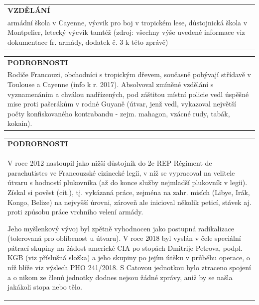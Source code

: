 \documentclass[a4paper, 11pt]{article}
\newlength{\fontheight}
\def\bottomrulewidth{0.3mm}		%
\def\tabtitleextraheight{5pt}	%
\def\tablestretch{1.4}			%
\newcommand{\blackcell}{\cellcolor{black} \color{white} \ttfamily \bfseries}
\newcommand{\tabtitle}[2]{\multicolumn{#1}{l}{\blackcell \MakeUppercase{#2}\rule{0pt}{\dimexpr \fontheight + 1pt + \tabtitleextraheight \relax} } \\ [\tabtitleextraheight]}
\newcommand{\ind}{\hspace*{8mm}}
\begin{document}
	\vspace*{0.5cm}
	\begin{table}[H]
		\renewcommand\tabularxcolumn[1]{m{#1}}
		\def\arraystretch{\tablestretch}
		\begin{tabularx}{\textwidth}{X}
			\tabtitle{1}{vzdělání}
			\ttfamily armádní škola v Cayenne, výcvik pro boj v tropickém lese, důstojnická škola v Montpelier, letecký výcvik tamtéž (zdroj: všechny výše uvedené informace viz dokumentace fr. armády, dodatek č. 3 k této zprávě)  \\ \bottomrule[\bottomrulewidth]
		\end{tabularx}
	\end{table}
	
	\begin{table}[H]
		\renewcommand\tabularxcolumn[1]{m{#1}}
		\def\arraystretch{\tablestretch}
		\begin{tabularx}{\textwidth}{X}
			\tabtitle{1}{podrobnosti}
			\ttfamily 
			
			\ind Rodiče Francouzi, obchodníci s tropickým dřevem, současně pobývají střídavě v Toulouse a Cayenne (info k r. 2017). Absolvoval zmíněné vzdělání s vyznamenáním a chválou nadřízených, pod záštitou místní policie vedl úspěšné mise proti pašerákům v rodné Guyaně (útvar, jenž vedl, vykazoval největší počty konfiskovaného kontrabandu - zejm. mahagon, vzácné rudy, tabák, kokain).
			\\ \bottomrule[\bottomrulewidth]
		\end{tabularx}
	\end{table}

	\begin{table}[H]
		\renewcommand\tabularxcolumn[1]{m{#1}}
		\def\arraystretch{\tablestretch}
		\begin{tabularx}{\textwidth}{X}
			\tabtitle{1}{podrobnosti}
			\ttfamily 
						
			\ind V roce 2012 nastoupil jako nižší důstojník do 2e REP Régiment de parachutistes ve Francouzské cizinecké legii, v níž se vypracoval na velitele útvaru s hodností plukovníka (až do konce služby nejmladší plukovník v legii). Získal si pověst \uv{vysoce efektivního potížisty} (cit.), tj. vykázaná práce, zejména na zahr. misích (Libye, Irák, Kongo, Belize) na nejvyšší úrovni, zároveň ale inicioval několik peticí, stávek aj. proti způsobu práce vrchního velení armády.
			
			\ind Jeho myšlenkový vývoj byl zpětně vyhodnocen jako postupná radikalizace (tolerovaná pro oblíbenost u útvaru). V roce 2018 byl vyslán v čele speciální pátrací skupiny na žádost americké CIA po stopách Dmitrije Petrova, podpl. KGB (viz příslušná složka) a jeho skupiny po jejím útěku v průběhu operace, o níž blíže viz výslech PHO 241/2018. S Catovou jednotkou bylo ztraceno spojení a o nikom ze členů jednotky dodnes nejsou žádné zprávy, aniž by se našla jakákoli stopa nebo tělo.
			\\ \bottomrule[\bottomrulewidth]
		\end{tabularx}
	\end{table}
	
\end{document}

